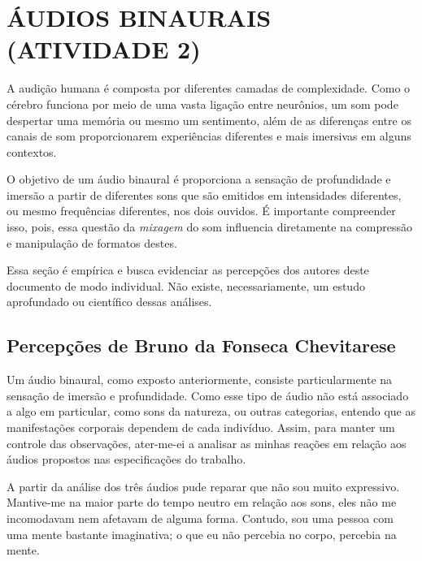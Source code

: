 \captionsetup{justification=centering,margin=0cm}

\chapter[ÁUDIOS BINAURAIS (ATIVIDADE 2)]{ÁUDIOS BINAURAIS (ATIVIDADE 2)}

A audição humana é composta por diferentes camadas de complexidade. Como o cérebro funciona por meio de uma vasta ligação entre neurônios, um som pode despertar uma memória ou mesmo um sentimento, além de as diferenças entre os canais de som proporcionarem experiências diferentes e mais imersivas em alguns contextos.

\hspace{1.5 cm} O objetivo de um áudio binaural é proporciona a sensação de profundidade e imersão a partir de diferentes sons que são emitidos em intensidades diferentes, ou mesmo frequências diferentes, nos dois ouvidos. É importante compreender isso, pois, essa questão da \textit{mixagem} do som influencia diretamente na compressão e manipulação de formatos destes.

\hspace{1.5 cm} Essa seção é empírica e busca evidenciar as percepções dos autores deste documento de modo individual. Não existe, necessariamente, um estudo aprofundado ou científico dessas análises.

\section{Percepções de Bruno da Fonseca Chevitarese}
Um áudio binaural, como exposto anteriormente, consiste particularmente na sensação de imersão e profundidade. Como esse tipo de áudio não está associado a algo em particular, como sons da natureza, ou outras categorias, entendo que as manifestações corporais dependem de cada indivíduo. Assim, para manter um controle das observações, ater-me-ei a analisar as minhas reações em relação aos áudios propostos nas especificações do trabalho.

\hspace{1.5 cm} A partir da análise dos três áudios pude reparar que não sou muito expressivo. Mantive-me na maior parte do tempo neutro em relação aos sons, eles não me incomodavam nem afetavam de alguma forma. Contudo, sou uma pessoa com uma mente bastante imaginativa; o que eu não percebia no corpo, percebia na mente.

